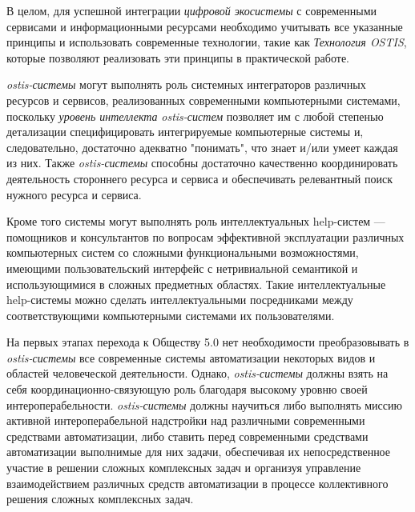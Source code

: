 В целом, для успешной интеграции \textit{цифровой экосистемы} с современными сервисами и информационными ресурсами необходимо учитывать все указанные принципы и использовать современные технологии, такие как \textit{Технология OSTIS}, которые позволяют реализовать эти принципы в практической работе.

\textit{ostis-системы} могут выполнять роль системных интеграторов различных ресурсов и сервисов, реализованных современными компьютерными системами, поскольку \textit{уровень интеллекта} \textit{ostis-систем} позволяет им с любой степенью детализации специфицировать интегрируемые компьютерные системы и, следовательно, достаточно адекватно "понимать", что знает и/или умеет каждая из них. Также \textit{ostis-системы} способны достаточно качественно координировать деятельность стороннего ресурса и сервиса и обеспечивать релевантный поиск нужного ресурса и сервиса.

Кроме того системы могут выполнять роль интеллектуальных help-систем --- помощников и консультантов по вопросам эффективной эксплуатации различных компьютерных систем со сложными функциональными возможностями, имеющими пользовательский интерфейс с нетривиальной семантикой и использующимися в сложных предметных областях. 
Такие интеллектуальные help-системы можно сделать интеллектуальными посредниками между соответствующими компьютерными системами их пользователями.

На первых этапах перехода к Обществу 5.0 нет необходимости преобразовывать в \textit{ostis-системы} все современные системы автоматизации некоторых видов и областей человеческой деятельности. 
Однако, \textit{ostis-системы} должны взять на себя координационно-связующую роль благодаря высокому уровню своей интероперабельности. 
\textit{ostis-системы} должны научиться либо выполнять миссию активной интероперабельной надстройки над различными современными средствами автоматизации, либо ставить перед современными средствами автоматизации выполнимые для них задачи, обеспечивая их непосредственное участие в решении сложных комплексных задач и организуя управление взаимодействием различных средств автоматизации в процессе коллективного решения сложных комплексных задач.
